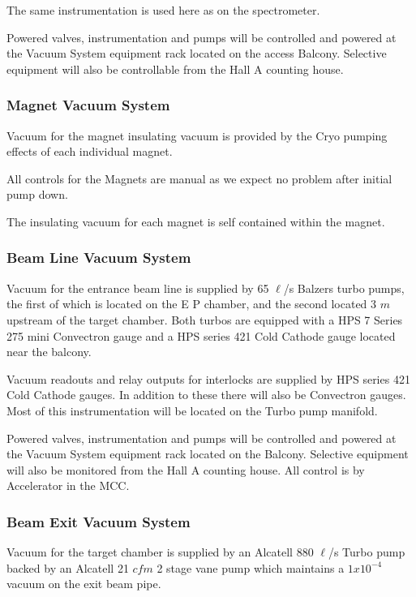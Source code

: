 The same instrumentation is used here as on the spectrometer.

Powered valves, instrumentation and pumps will be controlled and powered 
at the Vacuum System equipment rack located on the access Balcony.  
Selective equipment will also be controllable from the Hall A counting 
house. 

\subsubsection{Magnet Vacuum System}

Vacuum for the magnet insulating vacuum is provided by the Cryo
pumping effects of each individual magnet.

All controls for the Magnets are manual as we expect no problem after 
initial pump down.


The insulating vacuum for each magnet is self contained within the 
magnet.

\subsubsection{Beam Line Vacuum System}

Vacuum for the entrance beam line is supplied by 65 $\ell$/s Balzers turbo
pumps, the first of which is located on the E P chamber, and the
second located 3 $m$ upstream of the target chamber.  Both turbos
are equipped with a HPS 7 Series 275 mini Convectron gauge and a HPS
series 421 Cold Cathode gauge located near the balcony.

Vacuum readouts and relay outputs for interlocks are supplied by HPS series 421 
Cold Cathode gauges.  In addition to these there will also be Convectron 
gauges.  Most of this instrumentation will be located on the Turbo pump 
manifold.

Powered valves, instrumentation and pumps will be controlled and powered 
at the Vacuum System equipment rack located on the Balcony.  Selective 
equipment will also be monitored from the Hall A counting house.  All 
control is by Accelerator in the MCC.

\subsubsection{Beam Exit Vacuum System}

Vacuum for the target chamber is supplied by an Alcatell 880
$\ell$/s Turbo pump backed by an Alcatell 21 $cfm$ 2 stage vane pump
which maintains a $1x10^{-4}$ vacuum on the exit beam pipe.

